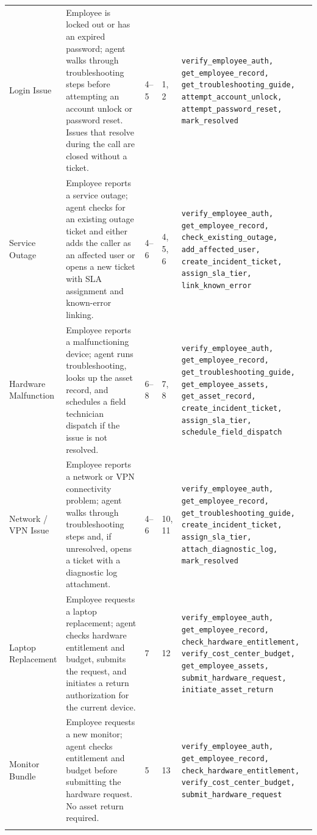 {\begin{longtable}{
  p{}
  p{}
  p{}
  p{}
  p{}}
Login Issue & Employee is locked out or has an expired password; agent walks through troubleshooting steps before attempting an account unlock or password reset. Issues that resolve during the call are closed without a ticket. & 4--5 & 1, 2 & \texttt{verify\_employee\_auth, get\_employee\_record, get\_troubleshooting\_guide, attempt\_account\_unlock, attempt\_password\_reset, mark\_resolved} \\
\addlinespace
Service Outage & Employee reports a service outage; agent checks for an existing outage ticket and either adds the caller as an affected user or opens a new ticket with SLA assignment and known-error linking. & 4--6 & 4, 5, 6 & \texttt{verify\_employee\_auth, get\_employee\_record, check\_existing\_outage, add\_affected\_user, create\_incident\_ticket, assign\_sla\_tier, link\_known\_error} \\
\addlinespace
Hardware Malfunction & Employee reports a malfunctioning device; agent runs troubleshooting, looks up the asset record, and schedules a field technician dispatch if the issue is not resolved. & 6--8 & 7, 8 & \texttt{verify\_employee\_auth, get\_employee\_record, get\_troubleshooting\_guide, get\_employee\_assets, get\_asset\_record, create\_incident\_ticket, assign\_sla\_tier, schedule\_field\_dispatch} \\
\addlinespace
Network / VPN Issue & Employee reports a network or VPN connectivity problem; agent walks through troubleshooting steps and, if unresolved, opens a ticket with a diagnostic log attachment. & 4--6 & 10, 11 & \texttt{verify\_employee\_auth, get\_employee\_record, get\_troubleshooting\_guide, create\_incident\_ticket, assign\_sla\_tier, attach\_diagnostic\_log, mark\_resolved} \\
\addlinespace
Laptop Replacement & Employee requests a laptop replacement; agent checks hardware entitlement and budget, submits the request, and initiates a return authorization for the current device. & 7 & 12 & \texttt{verify\_employee\_auth, get\_employee\_record, check\_hardware\_entitlement, verify\_cost\_center\_budget, get\_employee\_assets, submit\_hardware\_request, initiate\_asset\_return} \\
\addlinespace
Monitor Bundle & Employee requests a new monitor; agent checks entitlement and budget before submitting the hardware request. No asset return required. & 5 & 13 & \texttt{verify\_employee\_auth, get\_employee\_record, check\_hardware\_entitlement, verify\_cost\_center\_budget, submit\_hardware\_request} \\
\addlinespace

\end{longtable}}
